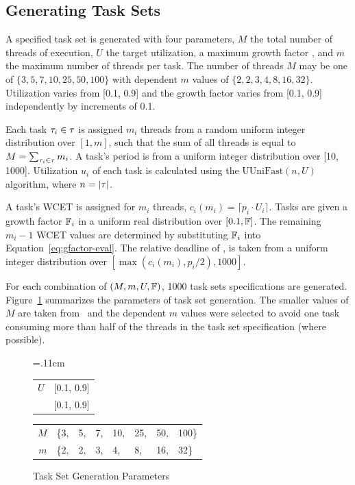 \documentclass[a4paper,UKenglish,cleveref,autoref,english]{lipics-v2019}
\begin{document}
\subsection{Generating Task Sets}

A specified task set \tasks{} is generated with four parameters,
${M}$ the total number of threads of execution, ${U}$ the target
utilization, a maximum growth factor \GFactor{}, and ${m}$ the maximum
number of threads per task. The number of threads ${M}$ may be one of
${\{3, 5, 7, 10, 25, 50, 100\}}$ with dependent ${m}$ values of
${\{2, 2, 3, 4, 8, 16, 32\}}$. Utilization varies from [0.1, 0.9]
and the growth factor varies from [0.1, 0.9] independently by
increments of 0.1. 

Each task ${\tau_{i} \in \tau{}}$ is assigned ${m_i}$ threads from
a random uniform integer distribution over ${[1, m]}$, such that the
sum of all threads is equal to ${M = \sum_{\tau_{i} \in \tau{}}
  m_i}$. A task's period  is from a uniform integer
distribution over [10, 1000]. Utilization ${u_i}$ of each task
 is calculated using the ${\text{UUniFast}(n,
  U)}$~\cite{Bini:2004} algorithm, where ${n = |\tau{}|}$.

A task's WCET is assigned for ${m_i}$ threads,
${c_i(m_i) = \lceil p_i \cdot U_i \rceil}$. Tasks
are given a growth factor ${\mathbb{F}{}_i}$ in a uniform real
distribution over ${[0.1, \mathbb{F}{}]}$.  The remaining ${m_i - 1}$
WCET values are determined by substituting ${\mathbb{F}{}_i}$ into
Equation~\ref{eq:gfactor-eval}. The relative deadline of ,
 is taken from a uniform integer distribution over
${[\max(c_i(m_i),p_i/2), 1000]}$.

For each combination of ${(M, m, U, \mathbb{F}{})}$, 1000 task sets
specifications are generated. Figure~\ref{fig:gen-params} summarizes
the parameters of task set generation. The smaller values of ${M}$ are taken
from~\cite{Bertogna:2010} and the dependent ${m}$ values were selected
to avoid one task consuming more than half of the threads in the
task set specification (where possible).

\begin{figure}[h]
  \centering
  \tabcolsep=.11cm
  \begin{tabular}{|r|l|}
    \hline
    ${U}$ & [0.1, 0.9] \\
    \GFactor{} & [0.1, 0.9] \\
    \hline
  \end{tabular} 
  \begin{tabular}{|r|lllllll|}
    \hline
    ${M}$ & \{3, & 5, & 7, & 10, & 25, & 50, & 100\} \\
    ${m}$ & \{2, & 2, & 3, & 4, & 8, & 16, & 32\} \\
    \hline
  \end{tabular}
  \caption{Task Set Generation Parameters }
  \label{fig:gen-params}
\end{figure}
\end{document}
